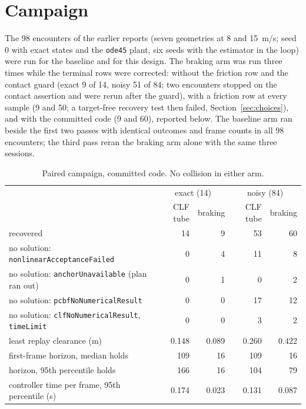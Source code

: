 \documentclass[11pt]{article}
\begin{document}
\section{Campaign}
The 98 encounters of the earlier reports (seven geometries at 8 and 15~m/s;
seed 0 with exact states and the \texttt{ode45} plant, six seeds with the
estimator in the loop) were run for the baseline and for this design. The
braking arm was run three times while the terminal rows were corrected:
without the friction row and the contact guard (exact 9 of 14, noisy 51 of
84; two encounters stopped on the contact assertion and were rerun after the
guard), with a friction row at every sample (9 and 50; a target-free recovery
test then failed, Section~\ref{sec:choices}), and with the committed code
(9 and 60), reported below. The baseline arm ran beside the first two passes
with identical outcomes and frame counts in all 98 encounters; the third pass
reran the braking arm alone with the same three sessions.

\begin{table}[h]
\centering\small
\caption{Paired campaign, committed code. No collision in either arm.}
\label{tab:campaign}
\begin{tabular}{lrrrr}
\toprule
 & \multicolumn{2}{c}{exact (14)} & \multicolumn{2}{c}{noisy (84)}\\
 & CLF tube & braking & CLF tube & braking\\
\midrule
recovered & 14 & 9 & 53 & 60\\
no solution: \texttt{nonlinearAcceptanceFailed} & 0 & 4 & 11 & 8\\
no solution: \texttt{anchorUnavailable} (plan ran out) & 0 & 1 & 0 & 2\\
no solution: \texttt{pcbfNoNumericalResult} & 0 & 0 & 17 & 12\\
no solution: \texttt{clfNoNumericalResult}, \texttt{timeLimit} & 0 & 0 & 3 & 2\\
least replay clearance (m) & 0.148 & 0.089 & 0.260 & 0.422\\
first-frame horizon, median holds & 109 & 16 & 109 & 16\\
horizon, 95th percentile holds & 166 & 16 & 104 & 79\\
controller time per frame, 95th percentile (s) & 0.174 & 0.023 & 0.131 & 0.087\\
\bottomrule
\end{tabular}
\end{table}
\end{document}
